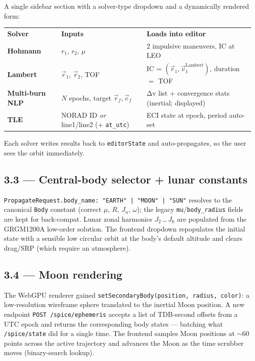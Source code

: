 \documentclass[11pt, a4paper]{article}
\begin{document}
A single sidebar section with a solver-type dropdown and a dynamically
rendered form:

\begin{center}
\begin{tabularx}{\textwidth}{>{\bfseries}l X X}
  \rowcolor{tabhead}\color{white}\textbf{Solver}
    & \color{white}\textbf{Inputs}
    & \color{white}\textbf{Loads into editor} \\
  Hohmann       & $r_1$, $r_2$, $\mu$
                & 2 impulsive maneuvers, IC at LEO \\
  Lambert       & $\vec r_1$, $\vec r_2$, TOF
                & IC = $(\vec r_1, \vec v_1^{\text{Lambert}})$, duration $=$ TOF \\
  Multi-burn NLP & $N$ epochs, target $\vec r_f, \vec v_f$
                & Δv list + convergence stats (inertial; displayed) \\
  TLE           & NORAD ID \emph{or} line1/line2 (+ \texttt{at\_utc})
                & ECI state at epoch, period auto-set \\
\end{tabularx}
\end{center}

Each solver writes results back to \texttt{editorState} and auto-propagates,
so the user sees the orbit immediately.

\subsection{3.3 — Central-body selector + lunar constants}

\texttt{PropagateRequest.body\_name: "EARTH" | "MOON" | "SUN"} resolves to
the canonical \texttt{Body} constant (correct $\mu$, $R$, $J_n$, $\omega$);
the legacy \texttt{mu}/\texttt{body\_radius} fields are kept for back-compat.
Lunar zonal harmonics $J_2$\,\dots\,$J_6$ are populated from the GRGM1200A
low-order solution. The frontend dropdown repopulates the initial state
with a sensible low circular orbit at the body's default altitude and
clears drag/SRP (which require an atmosphere).

\subsection{3.4 — Moon rendering}

The WebGPU renderer gained \texttt{setSecondaryBody(position, radius, color)}:
a low-resolution wireframe sphere translated to the inertial Moon position.
A new endpoint \texttt{POST /spice/ephemeris} accepts a list of TDB-second
offsets from a UTC epoch and returns the corresponding body states ---
batching what \texttt{/spice/state} did for a single time. The frontend
samples Moon positions at $\sim$60 points across the active trajectory and
advances the Moon as the time scrubber moves (binary-search lookup).
\end{document}
